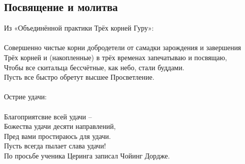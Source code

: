 \subsection{Посвящение и молитва}
Из «Объединённой практики Трёх корней Гуру»:\\
\\
Совершенно чистые корни добродетели от самадки зарождения и завершения\\
Трёх корней и (накопленные) в трёх временах запечатываю и посвящаю,\\
Чтобы все скитальца бессчётные, как небо, стали буддами.\\
Пусть все быстро обретут высшее Просветление.\\
\\
Острие удачи:\\
\\
Благоприятсвие всей удачи – \\
Божества удачи десяти направлений,\\
Пред вами простираюсь для удачи.\\
Пусть всегда пылает слава удачи!\\
По просьбе ученика Церинга записал Чойинг Дордже.\\
\\





% 